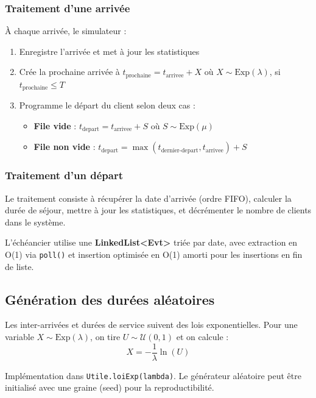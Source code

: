 \documentclass[12pt,a4paper]{article}
\begin{document}
\subsubsection{Traitement d'une arrivée}

À chaque arrivée, le simulateur :
\begin{enumerate}
    \item Enregistre l'arrivée et met à jour les statistiques
    \item Crée la prochaine arrivée à $t_{\text{prochaine}} = t_{\text{arrivee}} + X$ où $X \sim \text{Exp}(\lambda)$, si $t_{\text{prochaine}} \leq T$
    \item Programme le départ du client selon deux cas :
    \begin{itemize}
        \item \textbf{File vide} : $t_{\text{depart}} = t_{\text{arrivee}} + S$ où $S \sim \text{Exp}(\mu)$
        \item \textbf{File non vide} : $t_{\text{depart}} = \max(t_{\text{dernier-depart}}, t_{\text{arrivee}}) + S$
    \end{itemize}
\end{enumerate}

\subsubsection{Traitement d'un départ}

Le traitement consiste à récupérer la date d'arrivée (ordre FIFO), calculer la durée de séjour, mettre à jour les statistiques, et décrémenter le nombre de clients dans le système.

L'échéancier utilise une \textbf{LinkedList<Evt>} triée par date, avec extraction en O(1) via \texttt{poll()} et insertion optimisée en O(1) amorti pour les insertions en fin de liste.

\subsection{Génération des durées aléatoires}

Les inter-arrivées et durées de service suivent des lois exponentielles. Pour une variable $X \sim \text{Exp}(\lambda)$, on tire $U \sim \mathcal{U}(0,1)$ et on calcule :
\begin{equation}
    X = -\frac{1}{\lambda} \ln(U)
\end{equation}

Implémentation dans \texttt{Utile.loiExp(lambda)}. Le générateur aléatoire peut être initialisé avec une graine (seed) pour la reproductibilité.
\end{document}
